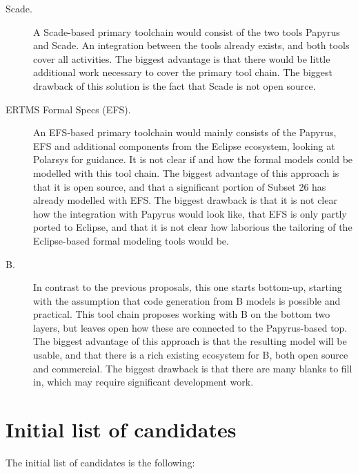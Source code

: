\begin{description}

\item[Scade.] A Scade-based primary toolchain would consist of the two tools Papyrus and Scade.  An integration between the tools already exists, and both tools cover all activities.  The biggest advantage is that there would be little additional work necessary to cover the primary tool chain.  The biggest drawback of this solution is the fact that Scade is not open source.

\item[ERTMS Formal Specs (EFS).] An EFS-based primary toolchain would mainly consists of the Papyrus, EFS and additional components from the Eclipse ecosystem, looking at Polarsys for guidance.  It is not clear if and how the formal models could be modelled with this tool chain.  The biggest advantage of this approach is that it is open source, and that a significant portion of Subset 26 has already modelled with EFS.  The biggest drawback is that it is not clear how the integration with Papyrus would look like, that EFS is only partly ported to Eclipse, and that it is not clear how laborious the tailoring of the Eclipse-based formal modeling tools would be.

\item[B.] In contrast to the previous proposals, this one starts bottom-up, starting with the assumption that code generation from B models is possible and practical.   This tool chain proposes working with B on the bottom two layers, but leaves open how these are connected to the Papyrus-based top.  The biggest advantage of this approach is that the resulting model will be usable, and that there is a rich existing ecosystem for B, both open source and commercial.  The biggest drawback is that there are many blanks to fill in, which may require significant development work.

\end{description}

\section{Initial  list of candidates}

The initial list of candidates is the following:


